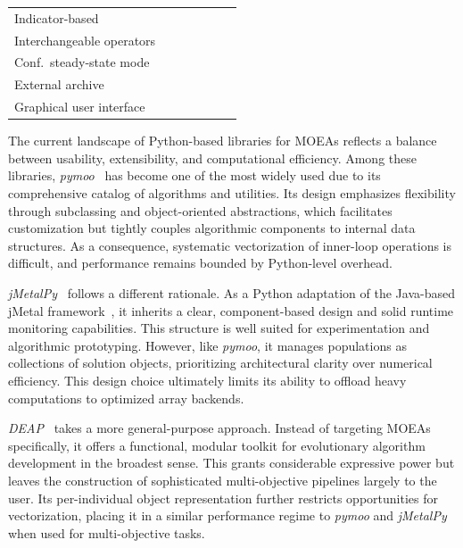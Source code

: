 \documentclass[journal]{IEEEtran}
\newcommand{\cmark}{\ding{51}}
\newcommand{\pmark}{\ding{109}}
\newcommand{\xmark}{\ding{55}}
\begin{document}
\begin{table}[!ht]
{\begin{tabular}{@{}lcccccc@{}}
Indicator-based               & \pmark & \cmark & \xmark & \cmark & \xmark & \cmark \\
Interchangeable operators     & \cmark & \cmark & \cmark & \pmark & \xmark & \cmark \\
Conf.\ steady-state mode      & \cmark & \cmark & \pmark & \xmark & \xmark & \cmark \\
External archive              & \xmark & \pmark & \pmark & \cmark & \xmark & \cmark \\
Graphical user interface      & \xmark & \xmark & \xmark & \xmark & \xmark & \cmark \\
\bottomrule
\end{tabular}}
\end{table}

The current landscape of Python-based libraries for MOEAs reflects a balance between usability, extensibility, and computational efficiency. Among these libraries, \textit{pymoo}~\cite{BD20} has become one of the most widely used due to its comprehensive catalog of algorithms and utilities. Its design emphasizes flexibility through subclassing and object-oriented abstractions, which facilitates customization but tightly couples algorithmic components to internal data structures. As a consequence, systematic vectorization of inner-loop operations is difficult, and performance remains bounded by Python-level overhead. 

\textit{jMetalPy}~\cite{BNG+19} follows a different rationale. As a Python adaptation of the Java-based jMetal framework~\cite{DN11}, it inherits a clear, component-based design and solid runtime monitoring capabilities. This structure is well suited for experimentation and algorithmic prototyping. However, like \textit{pymoo}, it manages populations as collections of solution objects, prioritizing architectural clarity over numerical efficiency. This design choice ultimately limits its ability to offload heavy computations to optimized array backends. 

\textit{DEAP}~\cite{FDG+12}  takes a more general-purpose approach. Instead of targeting MOEAs specifically, it offers a functional, modular toolkit for evolutionary algorithm development in the broadest sense. This grants considerable expressive power but leaves the construction of sophisticated multi-objective pipelines largely to the user. Its per-individual object representation further restricts opportunities for vectorization, placing it in a similar performance regime to \textit{pymoo} and \textit{jMetalPy} when used for multi-objective tasks.
\end{document}
